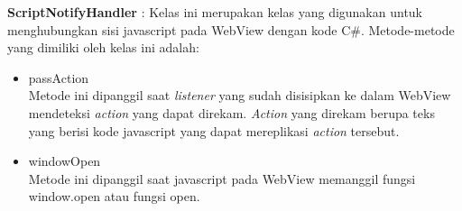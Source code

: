\documentclass[a4paper,twoside]{article}
\begin{document}
\begin{enumerate}
\begin{itemize}
{                \textbf{ScriptNotifyHandler} : Kelas ini merupakan kelas yang digunakan untuk menghubungkan sisi javascript pada WebView dengan kode C\#. Metode-metode yang dimiliki oleh kelas ini adalah:
                \begin{itemize}
                    \item{passAction\\Metode ini dipanggil saat \textit{listener} yang sudah disisipkan ke dalam WebView mendeteksi \textit{action} yang dapat direkam. \textit{Action} yang direkam berupa teks yang berisi kode javascript yang dapat mereplikasi \textit{action} tersebut.}
                    \item{windowOpen\\Metode ini dipanggil saat javascript pada WebView memanggil fungsi window.open atau fungsi open.}
                \end{itemize}
                
}
\end{itemize}
\end{enumerate}
\end{document}
